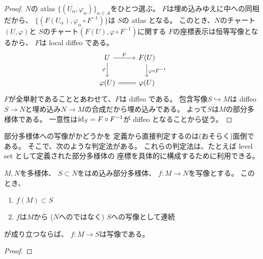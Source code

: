 \documentclass[report]{jlreq}
\begin{document}
\begin{proof}
    $N$の atlas $\{ (U_\alpha, \varphi_\alpha) \}_{\alpha \in A}$をひとつ選ぶ。
    $F$は埋め込みゆえに中への同相だから、
    $\{ (F(U_\alpha), \varphi_\alpha \circ F^{-1}) \}$は
    $S$の atlas となる。
    このとき、$N$のチャート$(U, \varphi)$と
    $S$のチャート$(F(U), \varphi \circ F^{-1})$に関する
    $F$の座標表示は恒等写像となるから、
    $F$は local diffeo である。
    \begin{equation}
        \begin{tikzcd}
            U
                \ar{r}{F}
                \ar{d}[swap]{\varphi}
                & F(U)
                    \ar{d}{\varphi \circ F^{-1}} \\
            \varphi(U)
                \ar[equal]{r}
                & \varphi(U)
        \end{tikzcd}
    \end{equation}
    $F$が全単射であることとあわせて、$F$は diffeo である。
    包含写像$S \hookrightarrow M$は
    diffeo $S \to N$と埋め込み$N \to M$の合成だから埋め込みである。
    よって$S$は$M$の部分多様体である。
    一意性は$\mathrm{id}_S = F \circ F^{-1}$が diffeo となることから従う。
\end{proof}

\begin{definition}
\end{definition}

部分多様体への写像が{\smooth}かどうかを
定義から直接判定するのは(おそらく)面倒である。
そこで、次のような判定法がある。
これらの判定法は、たとえば level set として定義された部分多様体の
座標を具体的に構成するために利用できる。

\begin{theorem}[はめ込み多様体への値域の制限]
    $M, N$を多様体、
    $S \subset N$をはめ込み部分多様体、
    $f \colon M \to N$を{\smooth}写像とする。
    このとき、
    \begin{enumerate}
        \item $f(M) \subset S$
        \item $f$は$M$から ($N$へのではなく) $S$への写像として連続
    \end{enumerate}
    が成り立つならば、
    $f \colon M \to S$は{\smooth}写像である。
\end{theorem}

\begin{proof}
    \TODO{}
\end{proof}
\end{document}
